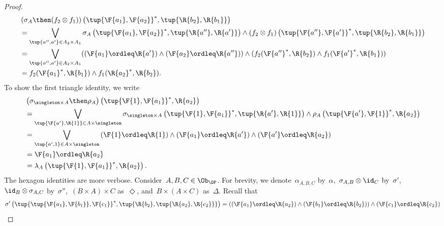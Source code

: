 \begin{proof}
  \begin{equation}
    \begin{aligned}
      &\left( \sigma_A \then (f_2\otimes f_1)\right)\left( \tup{\F{a_1},\F{a_2}}^*,\tup{\R{b_2},\R{b_1}}\right)\\
      &=\bigvee_{\tup{a'',a'}\in A_2\times A_1}\sigma_A\left(\tup{\F{a_1},\F{a_2}}^*,\tup{\R{a''},\R{a'}} \right)\wedge \left(f_2\otimes f_1\right) \left( \tup{\F{a''},\F{a'}}^*,\tup{\R{b_2},\R{b_1}}\right)\\
      &=\bigvee_{\tup{a'',a'}\in A_2\times A_1}(\left(\F{a_1}\ordleq \R{a'}\right)\wedge \left(\F{a_2}\ordleq \R{a''}\right)) \wedge (f_2(\F{a''}^*,\R{b_2})\wedge f_1(\F{a'}^*,\R{b_1}))\\
      &= f_2(\F{a_1}^*,\R{b_1}) \wedge f_1(\R{a_2}^*,\R{b_2}).
    \end{aligned}
  \end{equation}
  To show the first triangle identity, we write
  \begin{equation}
    \begin{aligned}
      &\left(\sigma_{\singleton \times A}\then \rho_A\right)\left( \tup{\F{1},\F{a_1}}^*,\R{a_2}\right)\\
      &=\bigvee_{\tup{\F{a'},\R{1}}\in A\times \singleton}\sigma_{\singleton \times A}\left( \tup{\F{1},\F{a_1}}^*,\tup{\R{a'},\R{1}}\right)\wedge \rho_A\left( \tup{\F{a'},\F{1}}^*,\R{a_2}\right)\\
      &=\bigvee_{\tup{a',1}\in A\times \singleton} \left(\F{1}\ordleq \R{1}\right) \wedge \left(\F{a_1}\ordleq \R{a'}\right)\wedge \left(\F{a'}\ordleq \R{a_2}\right)\\
      &=\F{a_1}\ordleq \R{a_2}\\
      &=\lambda_A\left( \tup{\F{1},\F{a_1}}^*,\R{a_2}\right).
    \end{aligned}
  \end{equation}
  The hexagon identities are more verbose. Consider~$A,B,C\in \Ob_\DP$. For brevity, we denote~$\alpha_{A,B,C}$ by~$\alpha$,~$\sigma_{A,B}\otimes \id_C$ by~$\sigma'$,~$\id_B \otimes \sigma_{A,C}$ by~$\sigma''$,~$(B\times A)\times C$ as~$\Diamond$, and~$B\times (A\times C)$ as~$\Delta$. Recall that
  \begin{equation}
    \begin{aligned}
      \sigma' \left(\tup{\tup{\F{a_1},\F{b_1}},\F{c_1}}^*,\tup{\R{b_2},\tup{\R{a_2},\R{c_2}}} \right)&=\left( (\F{a_1}\ordleq \R{a_2})  \wedge (\F{b_1}\ordleq \R{b_2})\right)\wedge (\F{c_1}\ordleq \R{c_2})\\

\end{aligned}
\end{equation}
\end{proof}
